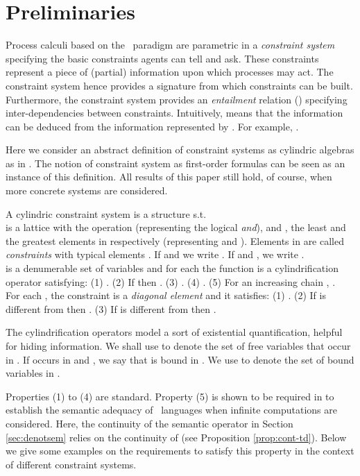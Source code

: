 \documentclass{tlp}
\begin{document}
\section{Preliminaries} \label{sec:cc}
Process calculi based on the \ccp\ paradigm are parametric in a
\emph{constraint system} specifying the basic constraints  agents can tell and ask.  These constraints  represent
a piece of (partial) information  upon  which processes may act. The
constraint system hence provides a signature from which  constraints
can be built. Furthermore, the constraint system provides an
\emph{entailment} relation () specifying inter-dependencies
between constraints. Intuitively,    means that the
information  can be deduced from the information represented by
. For example, . 

Here we consider an abstract definition of constraint systems as
cylindric algebras as in \cite{BoerPP95}. The notion of constraint system as first-order formulas  \cite{DBLP:conf/ccl/Smolka94,NPV02,Olarte:08:SAC}  can be
seen as an instance of this definition. All results of this paper
still hold, of course, when more concrete systems are considered. 

\begin{definition} \label{def:cs}
A cylindric constraint system  is a structure 
  s.t. 
\\\noindent{-}
  is a lattice
with  the  operation (representing the logical
\emph{and}), and ,  the least and the greatest
elements in  respectively (representing  and
). Elements in  are called \emph{constraints}
with typical elements . If  and  we write . If  and , we write . 
\\\noindent{-} is a denumerable set of variables and for each
 the function  is a
cylindrification operator satisfying:
		    (1) . 
		(2) If  then .
		(3) .
		(4) .
		(5) For an increasing chain , .
\\\noindent{-} For each , the constraint  is a
\emph{diagonal element} and it satisfies:
			(1) .
		(2) If  is different from  then .
		(3) If  is different from  then .
\end{definition}
The cylindrification operators model a sort of existential
quantification, helpful for hiding information. 
We shall use  to denote the set of free variables that occur in . If  occurs in   and , we say that  is bound in . We use  to denote the set of bound variables in . 


 Properties (1) to (4) are standard. Property (5) is shown to be required in \cite{BoerPP95} to establish the semantic adequacy of  \ccp\ languages when infinite computations are considered. Here,   the   continuity of the semantic operator 
 in Section \ref{sec:denotsem} relies on the continuity of  (see Proposition \ref{prop:cont-td}). Below we give some examples on the requirements to satisfy this property in the context of different constraint systems. 
 
\end{document}

